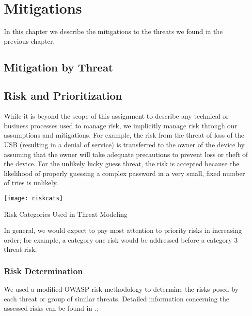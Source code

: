 \chapter{Mitigations}
\label{ch:mitigations}
In this chapter we describe the mitigations to the threats we found in
the previous chapter.

\section{Mitigation by Threat}

\section{Risk and Prioritization}
\label{sec:risk}
While it is beyond the scope of this assignment to describe any technical or
business processes used to manage risk, we implicitly manage risk through our
assumptions and mitigations.  For example, the risk from the threat of loss of
the USB (resulting in a denial of service) is transferred to the owner of the
device by assuming that the owner will take adequate precautions to prevent loss
or theft of the device.  For the unlikely lucky guess threat, the risk is
accepted because the likelihood of properly guessing a complex password in a
very small, fixed number of tries is unlikely.

\begin{marginfigure}
    \centering
    \texttt{[image: riskcats]}
    \caption{Risk Categories Used in Threat Modeling}
    \label{fig:riskcats}
\end{marginfigure}

In general, we would expect to pay most attention to priority risks in
increasing order; for example, a category one risk would be addressed before a
category 3 threat risk.

\subsection{Risk Determination}
We used a modified OWASP risk methodology to determine the risks posed by each
threat or group of similar threats. Detailed information concerning the assessed
risks can be found in .;
